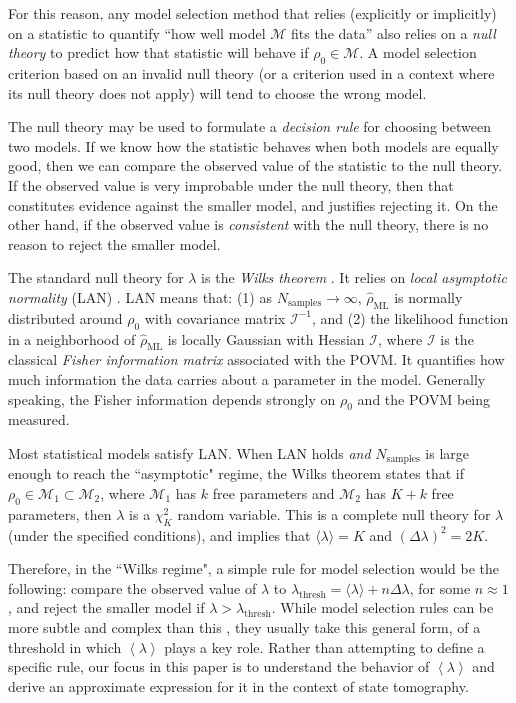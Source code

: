 \documentclass[aps,pra, twocolumn]{revtex4-1}
\newcommand{\M}{\mathcal{M}}
\newcommand{\expect}[1]{\ensuremath{\left\langle#1\right\rangle}}
\newcommand{\Fi}{\mathcal{I}}
\newcommand{\rhohat}{\hat{\rho}}
\begin{document}
For this reason, any model selection method that relies (explicitly or implicitly) on a statistic to quantify ``how well model $\M$ fits the data'' also relies on a \emph{null theory} to predict how that statistic will behave if $\rho_{0} \in \M$.  A model selection criterion based on an invalid null theory (or a criterion used in a context where its null theory does not apply) will tend to choose the wrong model.

The null theory may be used to formulate a \emph{decision rule} for choosing between two models. If we know how the statistic behaves when both models are equally good, then we can compare the observed value of the statistic to the null theory. If the observed value is very improbable under the null theory, then that constitutes evidence against the smaller model, and justifies rejecting it. On the other hand, if the observed value is \emph{consistent} with the null theory, there is no reason to reject the smaller model.

The standard null theory for $\lambda$ is the \emph{Wilks theorem} \cite{Wilks1938}. It relies on \emph{local asymptotic normality} (LAN) \cite{LeCam1970, LeCam1956}. LAN means that: (1) as $N_{\mathrm{samples}}\rightarrow \infty$,  $\rhohat_{\mathrm{ML}}$ is normally distributed around $\rho_{0}$ with covariance matrix $\Fi^{-1}$, and (2) the likelihood function in a neighborhood of $\rhohat_{\mathrm{ML}}$ is locally Gaussian with Hessian $\Fi$, where $\Fi$ is the classical \emph{Fisher information matrix} associated with the POVM. It quantifies how much information the data carries about a parameter in the model. Generally speaking, the Fisher information depends strongly on $\rho_{0}$ and the POVM being measured.

Most statistical models satisfy LAN.  When LAN holds \emph{and} $N_{\mathrm{samples}}$ is large enough to reach the ``asymptotic" regime, the Wilks theorem states that if $\rho_{0}\in \M_{1}\subset \M_{2}$, where $\M_{1}$ has $k$ free parameters and $\M_{2}$ has $K+k$ free parameters, then $\lambda$ is a $\chi^{2}_{K}$ random variable.  This is a complete null theory for $\lambda$ (under the specified conditions), and implies that $\langle \lambda \rangle = K$ and $(\Delta \lambda)^{2} = 2K$.

Therefore, in the ``Wilks regime", a simple rule for model selection would be the following: compare the observed value of $\lambda$ to $\lambda_{\mathrm{thresh}} = \langle \lambda \rangle + n\Delta \lambda$, for some $n \approx 1$, and reject the smaller model if $\lambda > \lambda_{\mathrm{thresh}}$.  While model selection rules can be more subtle and complex than this , they usually take this general form, of a threshold in which $\expect{\lambda}$ plays a key role.  Rather than attempting to define a specific rule, our focus in this paper is to understand the behavior of $\expect{\lambda}$ and derive an approximate expression for it in the context of state tomography.
\end{document}
